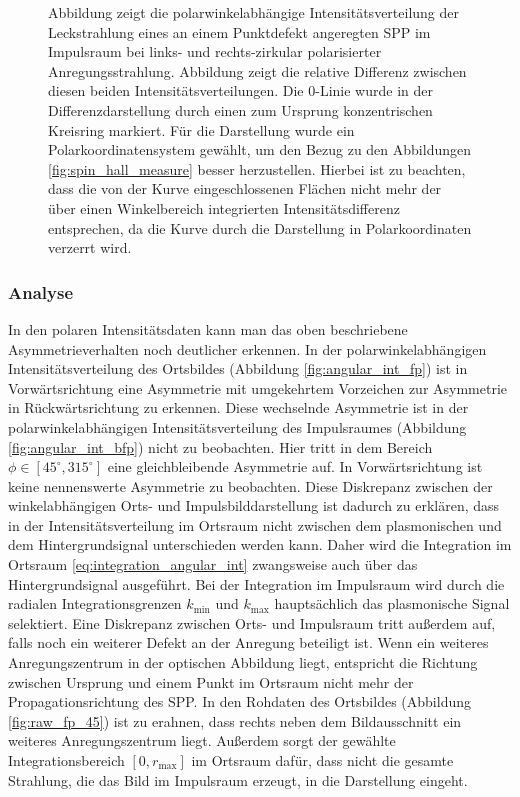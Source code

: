 \documentclass[a4paper, titlepage,  ngerman, fullpage]{book}
\begin{document}
\begin{figure}
			\caption[Polarwinkel Auswertung Impulsraum]{Abbildung  zeigt die polarwinkelabhängige Intensitätsverteilung der Leckstrahlung eines an einem Punktdefekt angeregten SPP im Impulsraum bei links- und rechts-zirkular polarisierter Anregungsstrahlung. Abbildung  zeigt die relative Differenz zwischen diesen beiden Intensitätsverteilungen. Die $0$-Linie wurde in der Differenzdarstellung durch einen zum Ursprung konzentrischen Kreisring markiert. Für die Darstellung wurde ein Polarkoordinatensystem gewählt, um den Bezug zu den Abbildungen \ref{fig:spin_hall_measure} besser herzustellen. Hierbei ist zu beachten, dass die von der Kurve eingeschlossenen Flächen nicht mehr der über einen Winkelbereich integrierten Intensitätsdifferenz entsprechen, da die Kurve durch die Darstellung in Polarkoordinaten verzerrt wird.}
			\label{fig:angular_dist_bfp}
		\end{figure}
		\subsubsection{Analyse}
		In den polaren Intensitätsdaten kann man das oben beschriebene Asymmetrieverhalten noch deutlicher erkennen. In der polarwinkelabhängigen Intensitätsverteilung des Ortsbildes (Abbildung \ref{fig:angular_int_fp}) ist in Vorwärtsrichtung eine Asymmetrie mit umgekehrtem Vorzeichen zur Asymmetrie in Rückwärtsrichtung zu erkennen. Diese wechselnde Asymmetrie ist in der polarwinkelabhängigen Intensitätsverteilung des Impulsraumes (Abbildung \ref{fig:angular_int_bfp}) nicht zu beobachten. Hier tritt in dem Bereich $\phi \in [45^\circ, 315^\circ]$ eine gleichbleibende Asymmetrie auf. In Vorwärtsrichtung ist keine nennenswerte Asymmetrie zu beobachten. Diese Diskrepanz zwischen der winkelabhängigen Orts- und Impulsbilddarstellung ist dadurch zu erklären, dass in der Intensitätsverteilung im Ortsraum nicht zwischen dem plasmonischen und dem Hintergrundsignal unterschieden werden kann. Daher wird die Integration im Ortsraum \eqref{eq:integration_angular_int} zwangsweise auch über das Hintergrundsignal ausgeführt. Bei der Integration im Impulsraum wird durch die radialen Integrationsgrenzen $k_\mathrm{min}$ und $k_\mathrm{max}$ hauptsächlich das plasmonische Signal selektiert. Eine Diskrepanz zwischen Orts- und Impulsraum tritt außerdem auf, falls noch ein weiterer Defekt an der Anregung beteiligt ist. Wenn ein weiteres Anregungszentrum in der optischen Abbildung liegt, entspricht die Richtung zwischen Ursprung und einem Punkt im Ortsraum nicht mehr der Propagationsrichtung des SPP. In den Rohdaten des Ortsbildes (Abbildung \ref{fig:raw_fp_45}) ist zu erahnen, dass rechts neben dem Bildausschnitt ein weiteres Anregungszentrum liegt. Außerdem sorgt der gewählte Integrationsbereich $[0, r_\mathrm{max}]$ im Ortsraum dafür, dass nicht die gesamte Strahlung, die das Bild im Impulsraum erzeugt, in die Darstellung eingeht.
		
\end{document}
